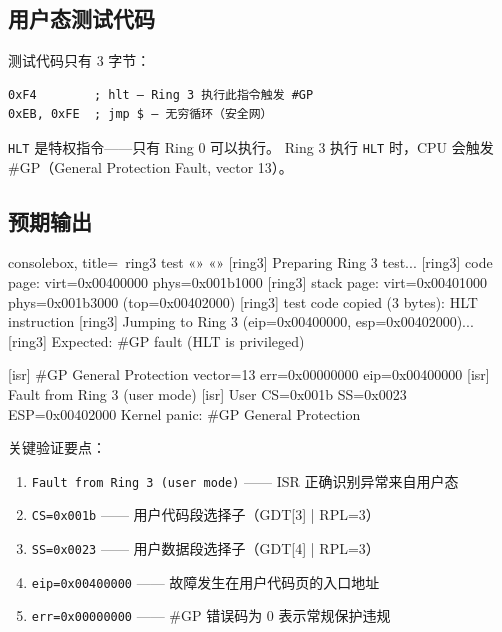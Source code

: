 \subsection{用户态测试代码}

测试代码只有 3 字节：

\begin{lstlisting}[style=nasmstyle]
0xF4        ; hlt — Ring 3 执行此指令触发 #GP
0xEB, 0xFE  ; jmp $ — 无穷循环（安全网）
\end{lstlisting}

\noindent \texttt{HLT} 是特权指令——只有 Ring 0 可以执行。
Ring 3 执行 \texttt{HLT} 时，CPU 会触发 \#GP（General Protection Fault, vector 13）。

\subsection{预期输出}

\begin{tcblisting}{consolebox, title={\tpk{>}~ring3 test}}
«» «»
[ring3] Preparing Ring 3 test...
[ring3] code page: virt=0x00400000 phys=0x001b1000
[ring3] stack page: virt=0x00401000 phys=0x001b3000 (top=0x00402000)
[ring3] test code copied (3 bytes): HLT instruction
[ring3] Jumping to Ring 3 (eip=0x00400000, esp=0x00402000)...
[ring3] Expected: #GP fault (HLT is privileged)

[isr] #GP General Protection vector=13 err=0x00000000 eip=0x00400000
[isr] Fault from Ring 3 (user mode)
[isr] User CS=0x001b  SS=0x0023  ESP=0x00402000
Kernel panic: #GP General Protection
\end{tcblisting}

关键验证要点：

\begin{enumerate}
  \item \texttt{Fault from Ring 3 (user mode)} —— ISR 正确识别异常来自用户态
  \item \texttt{CS=0x001b} —— 用户代码段选择子（GDT[3] | RPL=3）
  \item \texttt{SS=0x0023} —— 用户数据段选择子（GDT[4] | RPL=3）
  \item \texttt{eip=0x00400000} —— 故障发生在用户代码页的入口地址
  \item \texttt{err=0x00000000} —— \#GP 错误码为 0 表示常规保护违规
\end{enumerate}

